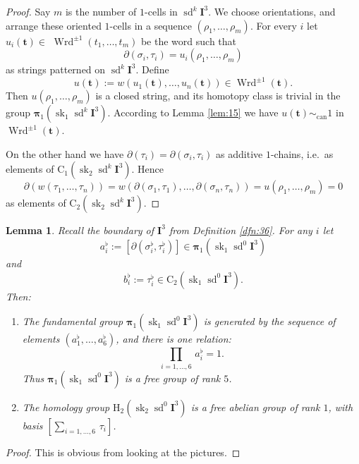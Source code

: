 \documentclass[10pt, a4paper]{amsart}
\newtheorem{lem}[equation]{Lemma}
\theoremstyle{definition}
\numberwithin{equation}{section}
\newcommand{\opn}{\operatorname}
\newcommand{\mbf}[1]{\mathbf{#1}}
\newcommand{\mrm}[1]{\mathrm{#1}}
\newcommand{\tup}[1]{\textup{#1}}
\newcommand{\bsym}[1]{\boldsymbol{#1}}
\begin{document}
\begin{proof}
Say $m$ is the number of $1$-cells in $\opn{sd}^k \mbf{I}^3$. 
We choose orientations, and arrange these oriented $1$-cells in a sequence
$(\rho_1, \ldots, \rho_m)$.
For every $i$ let $u_i(\bsym{t}) \in$ 
$\opn{Wrd}^{\pm 1}(t_1, \ldots, t_m)$
be the word such that
\[ \partial (\sigma_i, \tau_i) = u_i(\rho_1, \ldots, \rho_m) \]
as strings patterned on $\opn{sd}^k \mbf{I}^3$.
Define
\[ u(\bsym{t}) := w( u_1(\bsym{t}), \ldots, u_n(\bsym{t})) \in \opn{Wrd}^{\pm 1}
(\bsym{t}) . \]
Then $u(\rho_1, \ldots, \rho_m)$ is a closed string, and its homotopy class is
trivial in the group $\bsym{\pi}_1(\opn{sk}_1 \opn{sd}^k \mbf{I}^3)$.
According to Lemma \ref{lem:15} we have
$u(\bsym{t})  \sim_{\mrm{can}} 1$ in 
$\opn{Wrd}^{\pm 1}(\bsym{t})$.

On the other hand we have 
$\partial(\tau_i) = \partial (\sigma_i, \tau_i)$
as additive $1$-chains, i.e.\ as elements of
$\mrm{C}_1(\opn{sk}_2 \opn{sd}^k \mbf{I}^3)$.
Hence
\[ \partial(w(\tau_1, \ldots, \tau_n)) = 
w(\partial (\sigma_1, \tau_1), \ldots, \partial (\sigma_n, \tau_n))
= u(\rho_1, \ldots, \rho_m) = 0 \]
as elements of $\mrm{C}_2(\opn{sk}_2 \opn{sd}^k \mbf{I}^3)$.
\end{proof}

\begin{lem} \label{lem:21}
Recall the boundary of $\mbf{I}^3$ from Definition \tup{\ref{dfn:36}}.
For any $i$ let
\[ a^{\flat}_i := [\partial (\sigma^{\flat}_{i}, \tau^{\flat}_{i})] \in 
\bsym{\pi}_1(\opn{sk}_1 \opn{sd}^0 \mbf{I}^3) \]
and
\[ b^{\flat}_i := \tau^{\flat}_i \in 
\mrm{C}_2(\opn{sk}_1 \opn{sd}^0 \mbf{I}^3) . \]
Then:
\begin{enumerate}
\item The fundamental group 
$\bsym{\pi}_1(\opn{sk}_1 \opn{sd}^0 \mbf{I}^3)$ is generated by
the sequence of elements
$(a^{\flat}_1, \ldots, a^{\flat}_6)$, 
and there is one relation:
\[  \prod_{i = 1, \ldots, 6} \, a^{\flat}_i = 1 . \]
Thus $\bsym{\pi}_1(\opn{sk}_1 \opn{sd}^0 \mbf{I}^3)$ is a free group
of rank $5$.  
%
\item The homology group $\mrm{H}_2(\opn{sk}_2 \opn{sd}^0 \mbf{I}^3)$
is a free abelian group of rank $1$, with basis 
$[\sum_{i = 1, \ldots, 6} \, \tau_{i}]$.
\end{enumerate}
\end{lem}

\begin{proof}
This is obvious from looking at the pictures.
\end{proof}
\end{document}
